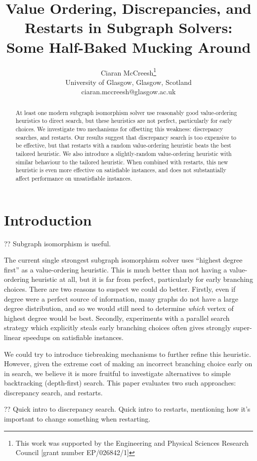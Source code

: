 \documentclass{article}
\title{Value Ordering, Discrepancies, and Restarts in Subgraph Solvers: \\ Some Half-Baked Mucking
Around}
\author{Ciaran McCreesh\thanks{This work was supported by the Engineering and Physical Sciences
    Research Council [grant number EP/026842/1]}\\ University of Glasgow, Glasgow, Scotland \\
    ciaran.mccreesh@glasgow.ac.uk}
\begin{document}
\maketitle

\begin{abstract}
    At least one modern subgraph isomorphism solver use reasonably good value-ordering heuristics to
    direct search, but these heuristics are not perfect, particularly for early choices. We
    investigate two mechanisms for offsetting this weakness: discrepancy searches, and restarts. Our
    results suggest that discrepancy search is too expensive to be effective, but that restarts with
    a random value-ordering heuristic beats the best tailored heuristic. We also introduce a
    slightly-random value-ordering heuristic with similar behaviour to the tailored heuristic.  When
    combined with restarts, this new heuristic is even more effective on satisfiable instances, and
    does not substantially affect performance on unsatisfiable instances.
\end{abstract}

\section{Introduction}

?? Subgraph isomorphism is useful.

The current single strongest subgraph isomorphism solver uses ``highest degree first'' as a
value-ordering heuristic.  This is much better than not having a value-ordering heuristic at all,
but it is far from perfect, particularly for early branching choices. There are two reasons to
suspect we could do better.  Firstly, even if degree were a perfect source of information, many
graphs do not have a large degree distribution, and so we would still need to determine \emph{which}
vertex of highest degree would be best.  Secondly, experiments with a parallel search strategy which
explicitly steals early branching choices often gives strongly super-linear speedups on satisfiable
instances.

We could try to introduce tiebreaking mechanisms to further refine this heuristic. However, given
the extreme cost of making an incorrect branching choice early on in search, we believe it is more
fruitful to investigate alternatives to simple backtracking (depth-first) search. This paper
evaluates two such approaches: discrepancy search, and restarts.

?? Quick intro to discrepancy search. Quick intro to restarts, mentioning how it's important to
change something when restarting.
\end{document}
